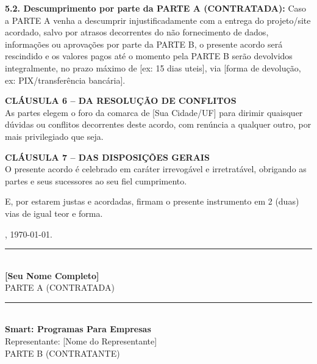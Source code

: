 \documentclass[12pt, a4paper]{article}
\begin{document}
\textbf{5.2. Descumprimento por parte da PARTE A (CONTRATADA):} Caso a PARTE A venha a descumprir injustificadamente com a entrega do projeto/site acordado, salvo por atrasos decorrentes do não fornecimento de dados, informações ou aprovações por parte da PARTE B, o presente acordo será rescindido e os valores pagos até o momento pela PARTE B serão devolvidos integralmente, no prazo máximo de [ex: 15 dias uteis], via [forma de devolução, ex: PIX/transferência bancária].

\vspace{0.5cm}
\noindent\textbf{CLÁUSULA 6 -- DA RESOLUÇÃO DE CONFLITOS} \\
As partes elegem o foro da comarca de [Sua Cidade/UF] para dirimir quaisquer dúvidas ou conflitos decorrentes deste acordo, com renúncia a qualquer outro, por mais privilegiado que seja.

\vspace{0.5cm}
\noindent\textbf{CLÁUSULA 7 -- DAS DISPOSIÇÕES GERAIS} \\
O presente acordo é celebrado em caráter irrevogável e irretratável, obrigando as partes e seus sucessores ao seu fiel cumprimento.

\vspace{1cm}
E, por estarem justas e acordadas, firmam o presente instrumento em 2 (duas) vias de igual teor e forma.

\vspace{1cm}
\begin{flushright}
    , \today.
\end{flushright}

\vspace{1.5cm}

\begin{center}
    \rule{8cm}{0.4pt} \\
    \textbf{[Seu Nome Completo]} \\
    PARTE A (CONTRATADA)
\end{center}

\vspace{1.5cm}

\begin{center}
    \rule{8cm}{0.4pt} \\
    \textbf{Smart: Programas Para Empresas} \\
    Representante: [Nome do Representante] \\
    PARTE B (CONTRATANTE)
\end{center}

\vspace{1.5cm}
\end{document}
